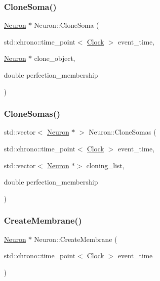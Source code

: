 \mbox{\label{classNeuron_a7706e0f722c70138458423c07b6b153b}} 
\subsubsection{\texorpdfstring{Clone\+Soma()}{CloneSoma()}}
{\footnotesize\ttfamily \mbox{\hyperlink{classNeuron}{Neuron}} $\ast$ Neuron\+::\+Clone\+Soma (\begin{DoxyParamCaption}\item[{std\+::chrono\+::time\+\_\+point$<$ \mbox{\hyperlink{universe_8h_a0ef8d951d1ca5ab3cfaf7ab4c7a6fd80}{Clock}} $>$}]{event\+\_\+time,  }\item[{\mbox{\hyperlink{classNeuron}{Neuron}} $\ast$}]{clone\+\_\+object,  }\item[{double}]{perfection\+\_\+membership }\end{DoxyParamCaption})}

\mbox{\label{classNeuron_a508841fa635a6e89609c514a79ea59da}} 
\subsubsection{\texorpdfstring{Clone\+Somas()}{CloneSomas()}}
{\footnotesize\ttfamily std\+::vector$<$ \mbox{\hyperlink{classNeuron}{Neuron}} $\ast$ $>$ Neuron\+::\+Clone\+Somas (\begin{DoxyParamCaption}\item[{std\+::chrono\+::time\+\_\+point$<$ \mbox{\hyperlink{universe_8h_a0ef8d951d1ca5ab3cfaf7ab4c7a6fd80}{Clock}} $>$}]{event\+\_\+time,  }\item[{std\+::vector$<$ \mbox{\hyperlink{classNeuron}{Neuron}} $\ast$$>$}]{cloning\+\_\+list,  }\item[{double}]{perfection\+\_\+membership }\end{DoxyParamCaption})}

\mbox{\label{classNeuron_af06efbcc1a96af0290673e9e048267cf}} 
\subsubsection{\texorpdfstring{Create\+Membrane()}{CreateMembrane()}}
{\footnotesize\ttfamily \mbox{\hyperlink{classNeuron}{Neuron}} $\ast$ Neuron\+::\+Create\+Membrane (\begin{DoxyParamCaption}\item[{std\+::chrono\+::time\+\_\+point$<$ \mbox{\hyperlink{universe_8h_a0ef8d951d1ca5ab3cfaf7ab4c7a6fd80}{Clock}} $>$}]{event\+\_\+time }\end{DoxyParamCaption})}

